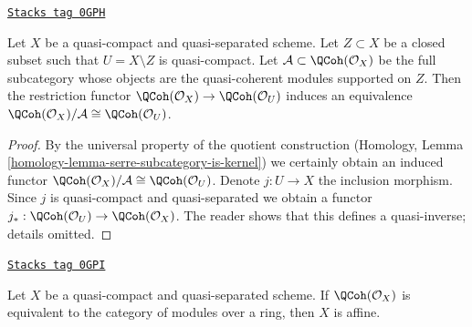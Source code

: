 \begin{lemma}
\label{functors-lemma-quotient-supported-on-closed}
\href{https://stacks.math.columbia.edu/tag/0GPH}{\texttt{Stacks tag 0GPH}}

Let $X$ be a quasi-compact and quasi-separated scheme.
Let $Z \subset X$ be a closed subset such that $U = X \setminus Z$
is quasi-compact. Let $\mathcal{A} \subset \QCoh(\mathcal{O}_X)$
be the full subcategory whose objects are the quasi-coherent modules
supported on $Z$. Then the restriction functor
$\QCoh(\mathcal{O}_X) \to \QCoh(\mathcal{O}_U)$ induces
an equivalence $\QCoh(\mathcal{O}_X)/\mathcal{A} \cong \QCoh(\mathcal{O}_U)$.
\end{lemma}

\begin{proof}
By the universal property of the quotient construction
(Homology, Lemma \ref{homology-lemma-serre-subcategory-is-kernel})
we certainly obtain an induced functor
$\QCoh(\mathcal{O}_X)/\mathcal{A} \cong \QCoh(\mathcal{O}_U)$.
Denote $j : U \to X$ the inclusion morphism. Since $j$ is quasi-compact
and quasi-separated we obtain a functor
$j_* : \QCoh(\mathcal{O}_U) \to \QCoh(\mathcal{O}_X)$.
The reader shows that this defines a quasi-inverse; details omitted.
\end{proof}

\begin{lemma}
\label{functors-lemma-characterize-affine}
\href{https://stacks.math.columbia.edu/tag/0GPI}{\texttt{Stacks tag 0GPI}}

Let $X$ be a quasi-compact and quasi-separated scheme.
If $\QCoh(\mathcal{O}_X)$ is equivalent to the category
of modules over a ring, then $X$ is affine.
\end{lemma}

